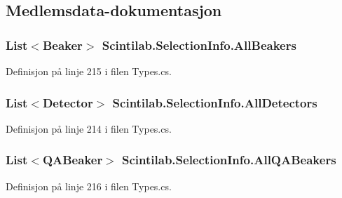 \subsection{Medlemsdata-\/dokumentasjon}
\hypertarget{class_scintilab_1_1_selection_info_a48b525ccc458db1fbc75243378864922}{
\subsubsection[{All\+Beakers}]{\setlength{\rightskip}{0pt plus 5cm}List$<${\bf Beaker}$>$ Scintilab.\+Selection\+Info.\+All\+Beakers}}\label{class_scintilab_1_1_selection_info_a48b525ccc458db1fbc75243378864922}


Definisjon på linje 215 i filen Types.\+cs.

\hypertarget{class_scintilab_1_1_selection_info_a23c987113ffb2b75a7253ae95579901c}{
\subsubsection[{All\+Detectors}]{\setlength{\rightskip}{0pt plus 5cm}List$<${\bf Detector}$>$ Scintilab.\+Selection\+Info.\+All\+Detectors}}\label{class_scintilab_1_1_selection_info_a23c987113ffb2b75a7253ae95579901c}


Definisjon på linje 214 i filen Types.\+cs.

\hypertarget{class_scintilab_1_1_selection_info_a524c6951cb71a220b5142cfd64f244cc}{
\subsubsection[{All\+Q\+A\+Beakers}]{\setlength{\rightskip}{0pt plus 5cm}List$<${\bf Q\+A\+Beaker}$>$ Scintilab.\+Selection\+Info.\+All\+Q\+A\+Beakers}}\label{class_scintilab_1_1_selection_info_a524c6951cb71a220b5142cfd64f244cc}


Definisjon på linje 216 i filen Types.\+cs.

